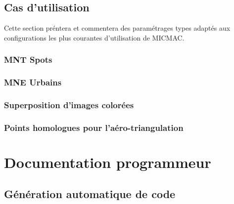 \documentclass[a4paper]{book}
\begin{document}




\chapter{Cas d'utilisation}

Cette section pr\'entera et commentera des param\'etrages types
adapt\'es aux configurations les plus courantes d'utilisation de
MICMAC.

\section{MNT Spots}
\section{MNE Urbains}
\section{Superposition d'images color\'ees}
\section{Points homologues pour l'a\'ero-triangulation}




\part{Documentation programmeur}

\chapter{G\'en\'eration automatique de code}
\end{document}
